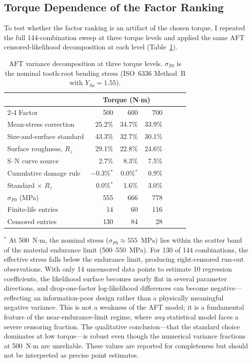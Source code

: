 \documentclass[12pt,a4paper]{article}
\begin{document}
\subsection{Torque Dependence of the Factor Ranking}
\label{sec:torque}

To test whether the factor ranking is an artifact of the chosen torque,
I repeated the full 144-combination sweep at three torque levels and
applied the same AFT censored-likelihood decomposition at each level
(Table~\ref{tab:torque}).

\begin{table}[h]
\centering
\caption{AFT variance decomposition at three torque levels.
$\sigma_{F0}$ is the nominal tooth-root bending stress (ISO~6336
Method~B with $Y_{Sa}=1.55$).%
}
\label{tab:torque}
\begin{tabular}{lrrrrrr}
\toprule
& \multicolumn{3}{c}{Torque (N$\cdot$m)} \\
\cmidrule(lr){2-4}
Factor & 500 & 600 & 700 \\
\midrule
Mean-stress correction & 25.2\% & 34.7\% & 33.9\% \\
Size-and-surface standard & 43.3\% & 32.7\% & 30.1\% \\
Surface roughness, $R_z$ & 29.1\% & 22.8\% & 24.6\% \\
S--N curve source & 2.7\% & 8.3\% & 7.5\% \\
Cumulative damage rule & $-$0.3\%$^*$ & 0.0\%$^*$ & 0.9\% \\
Standard $\times$ $R_z$ & 0.0\%$^*$ & 1.6\% & 3.0\% \\
\midrule
$\sigma_{F0}$ (MPa) & 555 & 666 & 778 \\
Finite-life entries & 14 & 60 & 116 \\
Censored entries & 130 & 84 & 28 \\
\bottomrule
\end{tabular}
\medskip\par
\small $^*$ At 500~N$\cdot$m, the nominal stress
($\sigma_{F0}\approx 555$~MPa) lies within the scatter band of the
material endurance limit (500--550~MPa). For 130 of 144 combinations,
the effective stress falls below the endurance limit, producing
right-censored run-out observations. With only 14 uncensored data
points to estimate 10 regression coefficients, the likelihood surface
becomes nearly flat in several parameter directions, and
drop-one-factor log-likelihood differences can become
negative---reflecting an information-poor design rather than a
physically meaningful negative variance. This is not a weakness of the
AFT model; it is a fundamental feature of the near-endurance-limit
regime, where \emph{any} statistical model faces a severe censoring
fraction. The qualitative conclusion---that the standard choice
dominates at low torque---is robust even though the numerical variance
fractions at 500~N$\cdot$m are unreliable. These values are reported
for completeness but should not be interpreted as precise point
estimates.
\end{table}
\end{document}
